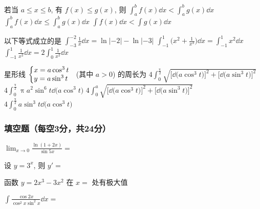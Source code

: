 \begin{ti}
	若当 $a \leqslant x \leqslant b$, 有 $f(x) \leqslant g(x)$, 则 \kuo
	{$\int_a^b f(x) \dd{x} < \int_a^b g(x) \dd{x}$}
	{$\int_a^b f(x) \dd{x} \leqslant \int_a^b g(x) \dd{x}$}
	{$\int f(x) \dd{x} < \int g(x) \dd{x}$}
\end{ti}

\begin{ti}
	以下等式成立的是 \kuo
	{$\int_{-3}^{-2} \frac{1}{x} \dd{x} = \ln\lvert-2\rvert - \ln\lvert-3\rvert$}
	{$\int_{-1}^1 \bigl( x^2 + \frac{1}{x^3} \bigr) \dd{x} = \int_{-1}^1 x^2 \dd{x}$}
	{$\int_{-1}^1 \frac{1}{x^2} \dd{x} = 2 \int_0^1 \frac{1}{x^2} \dd{x}$}
\end{ti}

\begin{ti}
	星形线 $\left\lbrace\begin{array}{@{}l}
		x = a \cos^3 t \\
		y = a \sin^3 t
	\end{array}\right.$ (其中 $a>0$) 的周长为 \kuo
	\fourch
	{$4 \int_0^{\frac{\uppi}{2}} \sqrt{ \bigl[ \dd{\bigl( a \cos^3 t \bigr)} \bigr]^2 + \bigl[ \dd{\bigl( a \sin^3 t \bigr)} \bigr]^2 }$}
	{$4\int_0^{\frac{\uppi}{2}} \uppi a^2 \sin^6 t \dd{\bigl( a \cos^3 t \bigr)}$}
	{$4 \int_0^{a} \sqrt{ \bigl[ \dd{\bigl( a \cos^3 t \bigr)} \bigr]^2 + \bigl[ \dd{\bigl( a \sin^3 t \bigr)} \bigr]^2 }$}
	{$4 \int_0^{\frac{\uppi}{2}} a \sin^3t \dd{\bigl( a \cos^3 t \bigr)}$}
\end{ti}

\subsubsection{填空题（每空3分，共24分）}
\begin{ti}
	$\lim_{x \to 0} \frac{\ln(1+2x)}{\sin 5x} = $ \hua
\end{ti}

\begin{ti}
	设 $y=3^x$, 则 $y' = $ \hua
\end{ti}

\begin{ti}
	函数 $y = 2x^3 - 3x^2$ 在 $x = $ \hua{} 处有极大值
\end{ti}

\begin{ti}
	$\int \frac{\cos 2x}{\cos^2 x \sin^2 x} \dd{x} = $ \hua
\end{ti}

